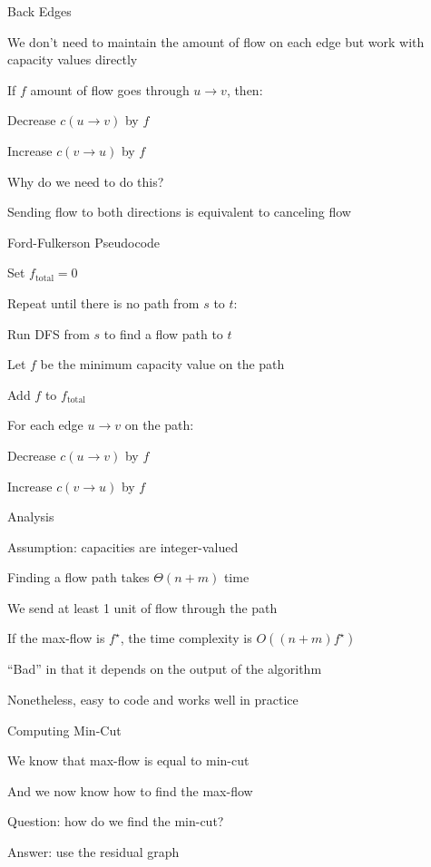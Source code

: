 \documentclass[13pt,onlymath]{beamer}
\begin{document}
\begin{frame}{Back Edges}
\BIT
\item We don't need to maintain the amount of flow on each edge but work with capacity values directly
\item If $f$ amount of flow goes through $u\rightarrow v$, then:
\BIT
\item Decrease $c(u\rightarrow v)$ by $f$
\item Increase $c(v\rightarrow u)$ by $f$
\EIT
\item Why do we need to do this?
\BIT
\item Sending flow to both directions is equivalent to canceling flow
\EIT \EIT
\end{frame}

\begin{frame}{Ford-Fulkerson Pseudocode}
\BIT
\item Set $f_\mathrm{total} = 0$
\item Repeat until there is no path from $s$ to $t$:
\BIT
\item Run DFS from $s$ to find a flow path to $t$
\item Let $f$ be the minimum capacity value on the path
\item Add $f$ to $f_\mathrm{total}$
\item For each edge $u \rightarrow v$ on the path:
\BIT
\item Decrease $c(u\rightarrow v)$ by $f$
\item Increase $c(v\rightarrow u)$ by $f$
\EIT \EIT \EIT
\end{frame}

\begin{frame}{Analysis}
\BIT
\item Assumption: capacities are integer-valued
\item Finding a flow path takes $\Theta(n+m)$ time
\item We send at least 1 unit of flow through the path
\item If the max-flow is $f^\star$, the time complexity is $O((n+m)f^\star)$
\BIT
\item ``Bad'' in that it depends on the output of the algorithm
\item Nonetheless, easy to code and works well in practice
\EIT \EIT
\end{frame}

\begin{frame}{Computing Min-Cut}
\BIT
\item We know that max-flow is equal to min-cut
\item And we now know how to find the max-flow
\vfill
\item Question: how do we find the min-cut?
\item Answer: use the residual graph
\EIT
\end{frame}
\end{document}
